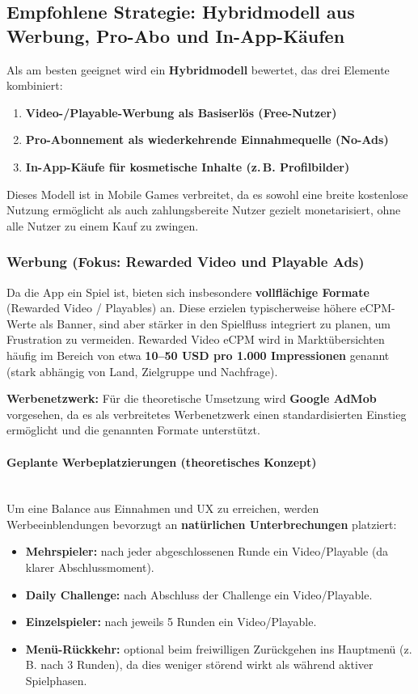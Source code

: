 \subsection{Empfohlene Strategie: Hybridmodell aus Werbung, Pro-Abo und In-App-Käufen}
Als am besten geeignet wird ein \textbf{Hybridmodell} bewertet, das drei Elemente kombiniert:
\begin{enumerate}
    \item \textbf{Video-/Playable-Werbung als Basiserlös (Free-Nutzer)}
    \item \textbf{Pro-Abonnement als wiederkehrende Einnahmequelle (No-Ads)}
    \item \textbf{In-App-Käufe für kosmetische Inhalte (z.\,B. Profilbilder)}
\end{enumerate}

Dieses Modell ist in Mobile Games verbreitet, da es sowohl eine breite kostenlose Nutzung ermöglicht als auch zahlungsbereite Nutzer gezielt monetarisiert, ohne alle Nutzer zu einem Kauf zu zwingen.

\subsubsection{Werbung (Fokus: Rewarded Video und Playable Ads)}
Da die App ein Spiel ist, bieten sich insbesondere \textbf{vollflächige Formate} (Rewarded Video / Playables) an. Diese erzielen typischerweise höhere \gls{eCPM}-Werte als Banner, sind aber stärker in den Spielfluss integriert zu planen, um Frustration zu vermeiden. Rewarded Video \gls{eCPM} wird in Marktübersichten häufig im Bereich von etwa \textbf{10--50 USD pro 1.000 Impressionen} genannt (stark abhängig von Land, Zielgruppe und Nachfrage). \cite{BoA_RewardedVideo}

\textbf{Werbenetzwerk:} Für die theoretische Umsetzung wird \textbf{Google AdMob} vorgesehen, da es als verbreitetes Werbenetzwerk einen standardisierten Einstieg ermöglicht und die genannten Formate unterstützt.

\paragraph{Geplante Werbeplatzierungen (theoretisches Konzept)}
\mbox{}\\
Um eine Balance aus Einnahmen und UX zu erreichen, werden Werbeeinblendungen bevorzugt an \textbf{natürlichen Unterbrechungen} platziert:
\begin{itemize}
    \item \textbf{Mehrspieler:} nach jeder abgeschlossenen Runde ein Video/Playable (da klarer Abschlussmoment).
    \item \textbf{Daily Challenge:} nach Abschluss der Challenge ein Video/Playable.
    \item \textbf{Einzelspieler:} nach jeweils 5 Runden ein Video/Playable.
    \item \textbf{Menü-Rückkehr:} optional beim freiwilligen Zurückgehen ins Hauptmenü (z.\,B. nach 3 Runden), da dies weniger störend wirkt als während aktiver Spielphasen.
\end{itemize}

